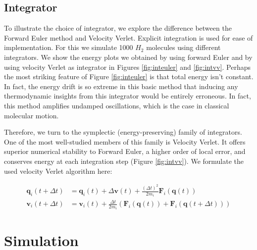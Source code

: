 \documentclass[11pt,a4paper]{article}
\begin{document}
\subsection{Integrator}

To illustrate the choice of integrator, we explore the difference between the Forward Euler method and Velocity Verlet. Explicit integration is used for ease of implementation. For this we simulate 1000 $H_2$ molecules using different integrators. We show the energy plots we obtained by using forward Euler and by using velocity Verlet as integrator in Figures \ref{fig:inteuler} and \ref{fig:intvv}. Perhaps the most striking feature of Figure \ref{fig:inteuler} is that total energy isn't constant. In fact, the energy drift is so extreme in this basic method that inducing any thermodynamic insights from this integrator would be entirely erroneous. In fact, this method amplifies undamped oscillations, which is the case in classical molecular motion.

Therefore, we turn to the symplectic (energy-preserving) family of integrators. One of the most well-studied members of this family is Velocity Verlet. It offers superior numerical stability to Forward Euler, a higher order of local error, and conserves energy at each integration step (Figure \ref{fig:intvv}). We formulate the used velocity Verlet algorithm here:

\begin{align*}
\textbf{q}_i(t+\Delta t) &= \textbf{q}_i(t) + \Delta \textbf{v}(t) + \frac{(\Delta t)^2}{2m_i}\textbf{F}_i(\textbf{q}(t)) \\
\textbf{v}_i(t+\Delta t) &= \textbf{v}_i(t) + \frac{\Delta t}{2m_i}\left(\textbf{F}_i(\textbf{q}(t))+\textbf{F}_i(\textbf{q}(t+\Delta t))\right)
\end{align*}

\section{Simulation}
\end{document}
